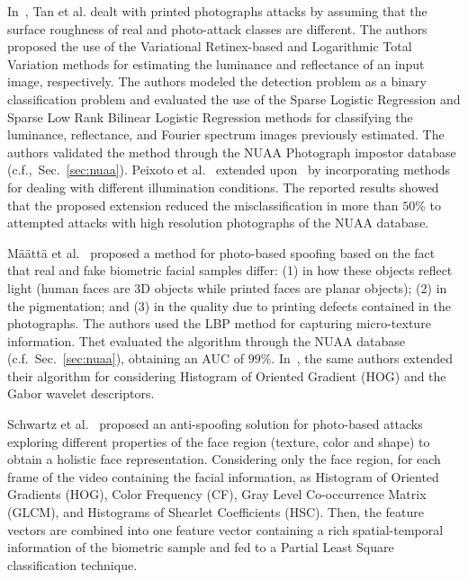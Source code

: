 \documentclass[journal]{IEEEtran}
\providecommand{\bmark}[1]{{\protect\color{black}{#1}}}
\begin{document}
In~\cite{Tan:ECCV:2010}, Tan et al. dealt with printed photographs attacks by assuming that the surface roughness of real and photo-attack classes are different. The authors proposed the use of the Variational Retinex-based and Logarithmic Total Variation methods for estimating the luminance and reflectance of an input image, respectively. The authors modeled the detection problem as a binary classification problem and evaluated the use of the Sparse Logistic Regression and Sparse Low Rank Bilinear Logistic Regression methods for classifying the luminance, reflectance, and Fourier spectrum images previously estimated. The authors validated the method through the NUAA Photograph impostor database (c.f.,~Sec.~\ref{sec:nuaa}). Peixoto et al.~\cite{Peixoto:ICIP:2011} extended upon~\cite{Tan:ECCV:2010} by incorporating methods for dealing with different illumination conditions. The reported results showed that the proposed extension reduced the misclassification in more than $50\%$ to attempted attacks with high resolution photographs of the NUAA database.

M\"{a}\"{a}tt\"{a} et al.~\cite{Maatta:IJCB:2011} proposed a method for photo-based spoofing based on the fact that real and fake biometric facial samples differ: (1) in how these objects reflect light (human faces are 3D objects while printed faces are planar objects); (2) in the pigmentation; and (3) in the quality due to printing defects contained in the photographs. The authors used the LBP method for capturing micro-texture information. Thet evaluated the algorithm through the NUAA database (c.f.~Sec.~\ref{sec:nuaa}), obtaining an AUC of $99\%$. In~\cite{Maatta:IET:2012}, the same authors extended their algorithm for considering Histogram of Oriented Gradient (HOG) and the Gabor wavelet descriptors.

Schwartz et al.~\cite{Schwartz:IJCB:2011} proposed an anti-spoofing solution for photo-based attacks exploring different properties of the face region (texture, color and shape) to obtain a holistic face representation. Considering only the face region, for each frame of the video containing the facial information, \bmark{we generate a feature vector formed by combining different low-level feature descriptors} as Histogram of Oriented Gradients (HOG), Color Frequency (CF), Gray Level Co-occurrence Matrix (GLCM), and Histograms of Shearlet Coefficients (HSC). Then, the feature vectors are combined into one feature vector containing a rich spatial-temporal information of the biometric sample and fed to a Partial Least Square classification technique.
\end{document}
